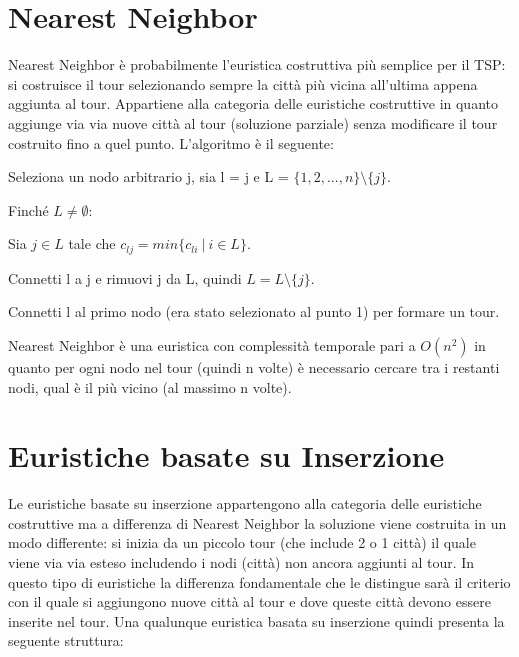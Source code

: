 \documentclass[a4paper,12pt]{report}
\begin{document}
\section{Nearest Neighbor} \label{sec:NN}
Nearest Neighbor è probabilmente l'euristica costruttiva più semplice per il TSP: si costruisce il tour selezionando sempre la città più vicina all'ultima appena aggiunta al tour. Appartiene alla categoria delle euristiche costruttive in quanto aggiunge via via nuove città al tour (soluzione parziale) senza modificare il tour costruito fino a quel punto. L'algoritmo è il seguente:

\begin{tcolorbox}[colframe=black,colback=white,boxrule=0.5pt, sharp corners]
\begin{legal}
  \item Seleziona un nodo arbitrario j, sia l = j e L = $\{1, 2, ..., n\} \setminus \{j\}$.
  \item Finché $L \neq \emptyset$:
  \begin{legal}
    \item Sia $j \in L$ tale che $c_{lj} = min\{c_{li} \  | \  i \in L\}$.
    \item Connetti l a j e rimuovi j da L, quindi $ L = L \setminus \{j\} $.
  \end{legal}
  \item Connetti l al primo nodo (era stato selezionato al punto 1) per formare un tour.
\end{legal}
\end{tcolorbox}
\hfill \break
Nearest Neighbor è una euristica con complessità temporale pari a $O(n^2)$ in quanto per ogni nodo nel tour (quindi n volte) è necessario cercare tra i restanti nodi, qual è il più vicino (al massimo n volte).

\section{Euristiche basate su Inserzione}
Le euristiche basate su inserzione appartengono alla categoria delle euristiche costruttive ma a differenza di Nearest Neighbor la soluzione viene costruita in un modo differente: si inizia da un piccolo tour (che include 2 o 1 città) il quale viene via via esteso includendo i nodi (città) non ancora aggiunti al tour. In questo tipo di euristiche la differenza fondamentale che le distingue sarà il criterio con il quale si aggiungono nuove città al tour e dove queste città devono essere inserite nel tour. Una qualunque euristica basata su inserzione quindi presenta la seguente struttura:
\end{document}
